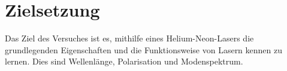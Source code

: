 \section{Zielsetzung}
\label{sec:zielsetzung}
Das Ziel des Versuches ist es, mithilfe eines Helium-Neon-Lasers die grundlegenden Eigenschaften und die Funktionsweise von Lasern kennen zu lernen.
Dies sind Wellenlänge, Polarisation und Modenspektrum.

